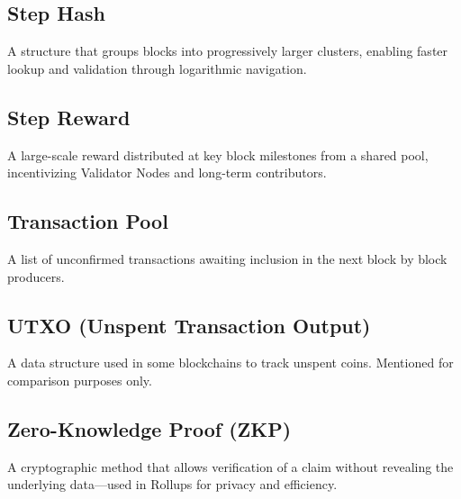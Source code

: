 \documentclass{article}
\begin{document}
\subsection*{Step Hash}
A structure that groups blocks into progressively larger clusters, enabling
faster lookup and validation through logarithmic navigation.

\subsection*{Step Reward}
A large-scale reward distributed at key block milestones from a shared pool,
incentivizing Validator Nodes and long-term contributors.

\subsection*{Transaction Pool}
A list of unconfirmed transactions awaiting inclusion in the next block by
block producers.

\subsection*{UTXO (Unspent Transaction Output)}
A data structure used in some blockchains to track unspent coins. Mentioned for
comparison purposes only.

\subsection*{Zero-Knowledge Proof (ZKP)}
A cryptographic method that allows verification of a claim without revealing
the underlying data—used in Rollups for privacy and efficiency.
\end{document}
